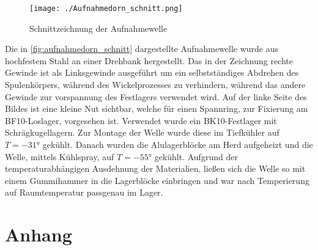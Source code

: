

\begin{figure}[H]
    \centering
    \texttt{[image: ./Aufnahmedorn\_schnitt.png]}
    \caption{Schnittzeichnung der Aufnahmewelle}
    \label{fig:aufnahmedorn_schnitt}
\end{figure}

Die in \autoref{fig:aufnahmedorn_schnitt} dargestellte Aufnahmewelle wurde aus hochfestem Stahl an einer Drehbank hergestellt. Das in der Zeichnung rechte Gewinde ist als Linksgewinde ausgeführt um ein selbstständiges Abdrehen des Spulenkörpers, während des Wickelprozesses zu verhindern, während das andere Gewinde zur vorspannung des Festlagers verwendet wird. Auf der linke Seite des Bildes ist eine kleine Nut sichtbar, welche für einen Spannring, zur Fixierung am BF10-Loslager, vorgesehen ist. Verwendet wurde ein BK10-Festlager mit Schrägkugellagern. Zur Montage der Welle wurde diese im Tiefkühler auf $T = -31\si{\degree}$ gekühlt. Danach wurden die Alulagerblöcke am Herd aufgeheizt und die Welle, mittels Kühlspray, auf $T = -55\si{\degree}$ gekühlt. Aufgrund der temperaturabhängigen Ausdehnung der Materialien, ließen sich die Welle so mit einem Gummihammer in die Lagerblöcke einbringen und war nach Temperierung auf Raumtemperatur passgenau im Lager.

\section{Anhang}

